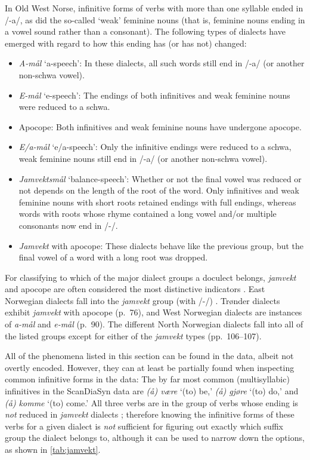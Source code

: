 In Old West Norse, infinitive forms of verbs with more than one syllable ended in /-a/, as did the so-called `weak' feminine nouns (that is, feminine nouns ending in a vowel sound rather than a consonant).
The following types of dialects have emerged with regard to how this ending has (or has not) changed:
\begin{itemize}
    \item \textit{A-mål} `a-speech': In these dialects, all such words still end in /-a/ (or another non-schwa vowel).
    \item \textit{E-mål} `e-speech': The endings of both infinitives and weak feminine nouns were reduced to a schwa.
    \item Apocope: Both infinitives and weak feminine nouns have undergone apocope.
    \item \textit{E/a-mål} `e/a-speech': Only the infinitive endings were reduced to a schwa, weak feminine nouns still end in /-a/ (or another non-schwa vowel).
    \item \textit{Jamvektsmål} `balance-speech': Whether or not the final vowel was reduced or not depends on the length of the root of the word. Only infinitives and weak feminine nouns with short roots retained endings with full endings, whereas words with roots whose rhyme contained a long vowel and/or multiple consonants now end in /-\textschwa{}/.
    \item \textit{Jamvekt} with apocope: These dialects behave like the previous group, but the final vowel of a word with a long root was dropped.
\end{itemize}

For classifying to which of the major dialect groups a doculect belongs, \textit{jamvekt} and apocope are often considered the most distinctive indicators \cite[pp.~32--42]{maehlum2012dialektlandskapet}.
East Norwegian dialects fall into the \textit{jamvekt} group (with /-\textschwa{}/) \cite[p.~46]{maehlum2012dialektlandskapet}.
Tr{\o}nder dialects exhibit \textit{jamvekt} with apocope (p.~76), and West Norwegian dialects are instances of \textit{a-mål} and \textit{e-mål} (p.~90).
The different North Norwegian dialects fall into all of the listed groups except for either of the \textit{jamvekt} types (pp.~106--107).

All of the phenomena listed in this section can be found in the data, albeit not overtly encoded.
However, they can at least be partially found when inspecting common infinitive forms in the data:
The by far most common (multisyllabic) infinitives in the ScanDiaSyn data are \textit{(å) være} `(to) be,' \textit{(å) gjøre} `(to) do,' and \textit{(å) komme} `(to) come.'
All three verbs are in the group of verbs whose ending is \textit{not} reduced in \textit{jamvekt} dialects \cite[cf.][p.~84]{hanssen2010dialekter}; therefore knowing the infinitive forms of these verbs for a given dialect is \textit{not} sufficient for figuring out exactly which suffix group the dialect belongs to, although it can be used to narrow down the options, as shown in \autoref{tab:jamvekt}.

